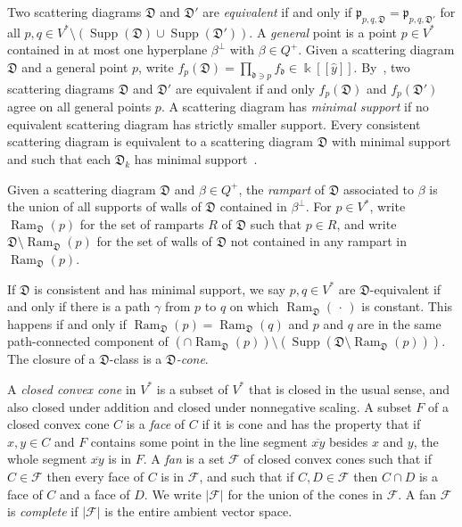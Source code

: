 \documentclass[ALCO,ThmDefs,Unicode,epreuves]{cedram}
\DeclareMathOperator{\Ram}{Ram}
\DeclareMathOperator{\Supp}{Supp}
\newcommand{\newword}[1]{\emph{#1}}
\newcommand\llbracket{[\![}
\newcommand\rrbracket{]\!]}
\newcommand{\F}{{\mathcal F}}
\newcommand{\D}{{\mathfrak D}}
\newcommand{\p}{{\mathfrak p}}
\renewcommand{\k}{\Bbbk}
\renewcommand{\d}{{\mathfrak d}}
\newcommand{\seg}[1]{\overline{#1}}
\newcommand{\hy}{\hat{y}}
\begin{document}
Two scattering diagrams $\D$ and $\D'$ are \newword{equivalent} if and only if $\p_{p,q,\D}=\p_{p,q,\D'}$ for all $p,q\in V^*\setminus(\Supp(\D)\cup\Supp(\D'))$.
A \newword{general} point is a point $p\in V^*$ contained in at most one hyperplane $\beta^\perp$ with $\beta\in Q^+$.
Given a scattering diagram $\D$ and a general point $p$, write $f_p(\D)=\prod_{\d\ni p}f_\d\in\k\llbracket \hy\rrbracket $.
By~\cite[Lemma~1.9]{GHKK}, two scattering diagrams $\D$ and $\D'$ are equivalent if and only $f_p(\D)$ and $f_p(\D')$ agree on all general points $p$.
A scattering diagram has \newword{minimal support} if no equivalent scattering diagram has strictly smaller support.
Every consistent scattering diagram is equivalent to a scattering diagram $\D$ with minimal support and such that each $\D_k$ has minimal support~\cite[Proposition~2.8]{scatfan}.

Given a scattering diagram $\D$ and $\beta\in Q^+$, the \newword{rampart} of $\D$ associated to $\beta$ is the union of all supports of walls of $\D$ contained in $\beta^\perp$. 
For $p\in V^*$, write $\Ram_\D(p)$ for the set of ramparts $R$ of $\D$ such that $p\in R$, and write $\D\setminus\Ram_\D(p)$ for the set of walls of $\D$ not contained in any rampart in $\Ram_\D(p)$.

If $\D$ is consistent and has minimal support, we say $p,q\in V^*$ are $\D$-equivalent if and only if there is a path $\gamma$ from $p$ to $q$ on which $\Ram_\D(\,\cdot\,)$ is constant.
This happens if and only if $\Ram_\D(p)=\Ram_\D(q)$ and $p$ and $q$ are in the same path-connected component of $(\cap\Ram_\D(p))\setminus(\Supp(\D\setminus\Ram_\D(p)))$.
The closure of a $\D$-class is a \newword{$\D$-cone}.

A \newword{closed convex cone} in $V^*$ is a subset of $V^*$ that is closed in the usual sense, and also closed under addition and closed under nonnegative scaling.
A subset $F$ of a closed convex cone $C$ is a \newword{face} of $C$ if it is cone and has the property that if $x,y\in C$ and $F$ contains some point in the line segment $\seg{xy}$ besides $x$ and $y$, the whole segment $\seg{xy}$ is in $F$.
A \newword{fan} is a set $\F$ of closed convex cones such that if $C\in\F$ then every face of $C$ is in $\F$, and such that if $C,D\in\F$ then $C\cap D$ is a face of $C$ and a face of $D$.
We write $|\F|$ for the union of the cones in $\F$.
A fan $\F$ is \newword{complete} if $|\F|$ is the entire ambient vector space.
\end{document}
